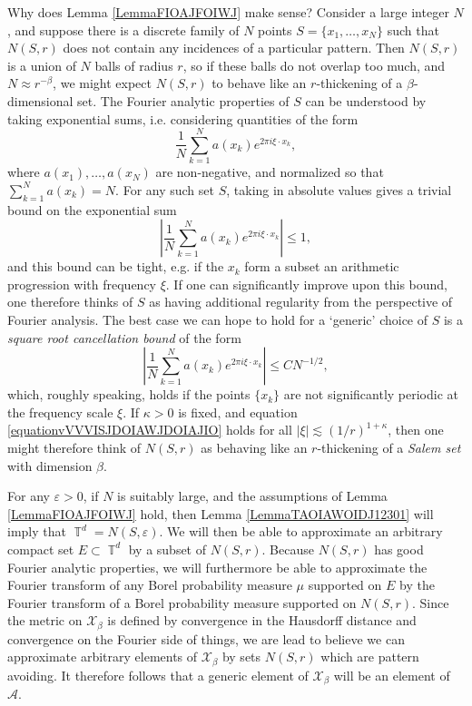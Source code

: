 \documentclass[dvipsnames,letterpaper,12pt]{article}
\numberwithin{equation}{section}
\DeclareMathOperator{\TT}{\mathbb{T}}
\numberwithin{theorem}{section}
\begin{document}
Why does Lemma \ref{LemmaFIOAJFOIWJ} make sense? Consider a large integer $N$, and suppose there is a discrete family of $N$ points $S = \{ x_1, \dots, x_N \}$ such that $N(S,r)$ does not contain any incidences of a particular pattern. Then $N(S,r)$ is a union of $N$ balls of radius $r$, so if these balls do not overlap too much, and $N \approx r^{-\beta}$, we might expect $N(S,r)$ to behave like an $r$-thickening of a $\beta$-dimensional set. The Fourier analytic properties of $S$ can be understood by taking exponential sums, i.e. considering quantities of the form
%
\[ \frac{1}{N} \sum_{k = 1}^N a(x_k) e^{2 \pi i \xi \cdot x_k}, \]
%
where $a(x_1),\dots,a(x_N)$ are non-negative, and normalized so that $\sum_{k = 1}^N a(x_k) = N$. For any such set $S$, taking in absolute values gives a trivial bound on the exponential sum
%
\begin{equation}
    \left| \frac{1}{N} \sum_{k = 1}^N a(x_k) e^{2 \pi i \xi \cdot x_k} \right| \leq 1,
\end{equation}
%
and this bound can be tight, e.g. if the $x_k$ form a subset an arithmetic progression with frequency $\xi$. If one can significantly improve upon this bound, one therefore thinks of $S$ as having additional regularity from the perspective of Fourier analysis. The best case we can hope to hold for a `generic' choice of $S$ is a \emph{square root cancellation bound} of the form
%
\begin{equation} \label{equationvVVVISJDOIAWJDOIAJIO}
    \left| \frac{1}{N} \sum_{k = 1}^N a(x_k) e^{2 \pi i \xi \cdot x_k} \right| \leq C N^{-1/2},
\end{equation}
%
which, roughly speaking, holds if the points $\{ x_k \}$ are not significantly periodic at the frequency scale $\xi$. If $\kappa > 0$ is fixed, and equation \eqref{equationvVVVISJDOIAWJDOIAJIO} holds for all $|\xi| \lesssim (1/r)^{1 + \kappa}$, then one might therefore think of $N(S,r)$ as behaving like an $r$-thickening of a \emph{Salem set} with dimension $\beta$.

For any $\varepsilon > 0$, if $N$ is suitably large, and the assumptions of Lemma \ref{LemmaFIOAJFOIWJ} hold, then Lemma \ref{LemmaTAOIAWOIDJ12301} will imply that $\TT^d = N(S,\varepsilon)$. We will then be able to approximate an arbitrary compact set $E \subset \TT^d$ by a subset of $N(S,r)$. Because $N(S,r)$ has good Fourier analytic properties, we will furthermore be able to approximate the Fourier transform of any Borel probability measure $\mu$ supported on $E$ by the Fourier transform of a Borel probability measure supported on $N(S,r)$. Since the metric on $\mathcal{X}_\beta$ is defined by convergence in the Hausdorff distance and convergence on the Fourier side of things, we are lead to believe we can approximate arbitrary elements of $\mathcal{X}_\beta$ by sets $N(S,r)$ which are pattern avoiding. It therefore follows that a generic element of $\mathcal{X}_\beta$ will be an element of $\mathcal{A}$.
\end{document}
